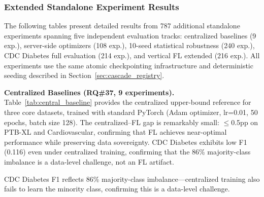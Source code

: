 \documentclass[conference]{IEEEtran}
\begin{document}
\subsubsection{Extended Standalone Experiment Results}
\label{sec:extended_standalone}

The following tables present detailed results from 787 additional standalone experiments spanning five independent evaluation tracks: centralized baselines (9 exp.), server-side optimizers (108 exp.), 10-seed statistical robustness (240 exp.), CDC Diabetes full evaluation (214 exp.), and vertical FL extended (216 exp.). All experiments use the same atomic checkpointing infrastructure and deterministic seeding described in Section~\ref{sec:cascade_registry}.

\smallskip\noindent\textbf{Centralized Baselines (RQ\#37, 9 experiments).}
Table~\ref{tab:central_baseline} provides the centralized upper-bound reference for three core datasets, trained with standard PyTorch (Adam optimizer, lr=0.01, 50 epochs, batch size 128). The centralized--FL gap is remarkably small: $\leq$0.5pp on PTB-XL and Cardiovascular, confirming that FL achieves near-optimal performance while preserving data sovereignty. CDC Diabetes exhibits low F1 (0.116) even under centralized training, confirming that the 86\% majority-class imbalance is a data-level challenge, not an FL artifact.

\begin{table}[htbp]
\centering
\caption{Centralized Training Baselines (Upper-Bound Reference). Mean $\pm$ std over 3 seeds (42, 123, 456). Adam optimizer, lr=0.01, 50 epochs.}
\label{tab:central_baseline}
\par{\footnotesize CDC Diabetes F1 reflects 86\% majority-class imbalance---centralized training also fails to learn the minority class, confirming this is a data-level challenge.}
\end{table}
\end{document}
